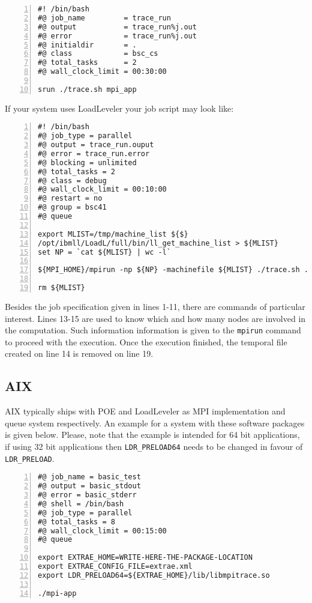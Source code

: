 \begin{Verbatim}[frame=single,numbers=left,labelposition=topline,label=slurm-trace.sh]
#! /bin/bash
#@ job_name         = trace_run
#@ output           = trace_run%j.out
#@ error            = trace_run%j.out
#@ initialdir       = .
#@ class            = bsc_cs
#@ total_tasks      = 2
#@ wall_clock_limit = 00:30:00

srun ./trace.sh mpi_app 
\end{Verbatim}

If your system uses LoadLeveler your job script may look like:

\begin{Verbatim}[frame=single,numbers=left,labelposition=topline,label=ll.sh]
#! /bin/bash
#@ job_type = parallel
#@ output = trace_run.ouput
#@ error = trace_run.error
#@ blocking = unlimited
#@ total_tasks = 2
#@ class = debug
#@ wall_clock_limit = 00:10:00
#@ restart = no
#@ group = bsc41 
#@ queue

export MLIST=/tmp/machine_list ${$}
/opt/ibmll/LoadL/full/bin/ll_get_machine_list > ${MLIST}
set NP = `cat ${MLIST} | wc -l`

${MPI_HOME}/mpirun -np ${NP} -machinefile ${MLIST} ./trace.sh ./mpi-app

rm ${MLIST}
\end{Verbatim}

Besides the job specification given in lines 1-11, there are commands of particular interest. Lines 13-15 are used to know which and how many nodes are involved in the computation. Such information information is given to the {\tt mpirun} command to proceed with the execution. Once the execution finished, the temporal file created on line 14 is removed on line 19.

\subsection{AIX}\label{subsec:Examples_AIX}

AIX typically ships with POE and LoadLeveler as MPI implementation and queue system respectively. An example for a system with these software packages is given below. Please, note that the example is intended for 64 bit applications, if using 32 bit applications then {\tt LDR\_PRELOAD64} needs to be changed in favour of {\tt LDR\_PRELOAD}.

\begin{Verbatim}[frame=single,numbers=left,labelposition=topline,label=ll-aix64.sh]
#@ job_name = basic_test
#@ output = basic_stdout
#@ error = basic_stderr
#@ shell = /bin/bash
#@ job_type = parallel
#@ total_tasks = 8
#@ wall_clock_limit = 00:15:00
#@ queue

export EXTRAE_HOME=WRITE-HERE-THE-PACKAGE-LOCATION
export EXTRAE_CONFIG_FILE=extrae.xml
export LDR_PRELOAD64=${EXTRAE_HOME}/lib/libmpitrace.so

./mpi-app
\end{Verbatim}

